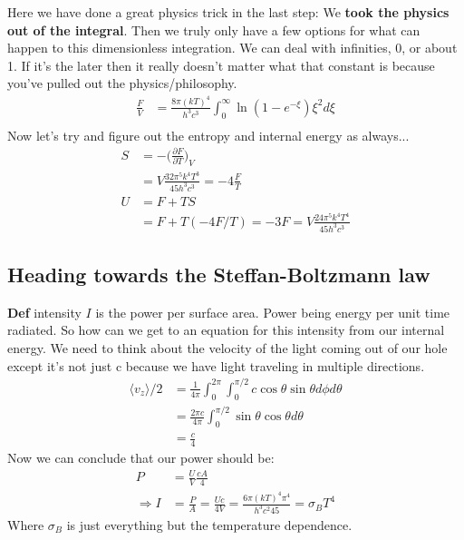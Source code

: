 \documentclass[a4paper, 11pt]{article}
\begin{document}
	\noindent Here we have done a great physics trick in the last step: We \textbf{took the physics out of the integral}. Then we truly only have a few options for what can happen to this dimensionless integration. We can deal with infinities, 0, or about 1. If it's the later then it really doesn't matter what that constant is because you've pulled out the physics/philosophy. \\ 
		\begin{align*}
			\frac{F}{V} &= \frac{8\pi(kT)^4}{h^3c^3}\int_0^\infty \ln(1-e^{-\xi})\xi^2d\xi \\ 
		\end{align*}
	\noindent Now let's try and figure out the entropy and internal energy as always...
		\begin{align*}
			S 	&= -\Big(\frac{\partial F}{\partial T}\Big)_V \\ 
				&= V\frac{32\pi^5k^4T^3}{45 h^3c^3} = -4\frac{F}{T} \\
			U 	&= F + TS \\ 
				&= F+T(-4F/T) = -3F =V\frac{24\pi^5k^4T^4}{45h^3c^3}
		\end{align*}


\subsection*{Heading towards the Steffan-Boltzmann law} 
	\textbf{Def} intensity $I$ is the power per surface area. Power being energy per unit time radiated. So how can we get to an equation for this intensity from our internal energy. We need to think about the velocity of the light coming out of our hole except it's not just c because we have light traveling in multiple directions.
		\begin{align*}
			\langle v_z \rangle /2 &=  \frac{1}{4\pi} \int_0^{2\pi}\int_0^{\pi/2} c \cos\theta \sin\theta d\phi d\theta \\ 
				&=  \frac{2\pi c}{4\pi}\int_0^{\pi/2} \sin\theta \cos\theta d\theta \\
				&= \frac{c}{4}
		\end{align*}
	Now we can conclude that our power should be:
		 \begin{align*}
			 P &= \frac{U}{V}\frac{cA}{4} \\ 
			 \Rightarrow I &= \frac{P}{A} = \frac{Uc}{4V} = \frac{6\pi(kT)^4\pi^4}{h^3c^2 45} = \sigma_BT^4
		 \end{align*}
	\noindent Where $\sigma_B$ is just everything but the temperature dependence. 
\end{document}

